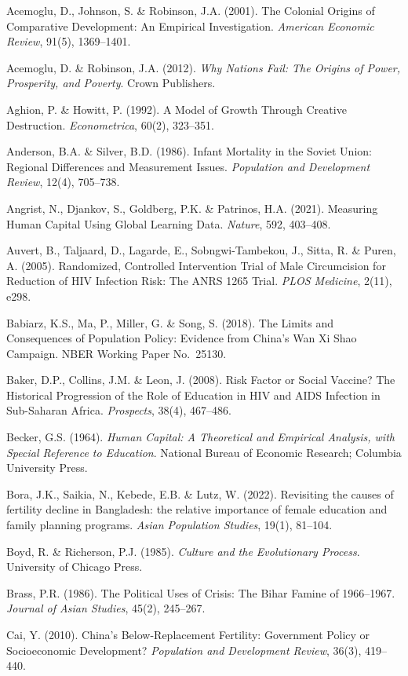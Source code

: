 Acemoglu, D., Johnson, S. \& Robinson, J.A. (2001). The Colonial Origins of Comparative Development: An Empirical Investigation. \emph{American Economic Review}, 91(5), 1369--1401.

Acemoglu, D. \& Robinson, J.A. (2012). \emph{Why Nations Fail: The
Origins of Power, Prosperity, and Poverty}. Crown Publishers.

Aghion, P. \& Howitt, P. (1992). A Model of Growth Through Creative
Destruction. \emph{Econometrica}, 60(2), 323--351.

Anderson, B.A. \& Silver, B.D. (1986). Infant Mortality in the Soviet
Union: Regional Differences and Measurement Issues. \emph{Population
and Development Review}, 12(4), 705--738.

Angrist, N., Djankov, S., Goldberg, P.K. \& Patrinos, H.A. (2021).
Measuring Human Capital Using Global Learning Data. \emph{Nature}, 592,
403--408.

Auvert, B., Taljaard, D., Lagarde, E., Sobngwi-Tambekou, J., Sitta, R.
\& Puren, A. (2005). Randomized, Controlled Intervention Trial of Male
Circumcision for Reduction of HIV Infection Risk: The ANRS 1265 Trial.
\emph{PLOS Medicine}, 2(11), e298.

Babiarz, K.S., Ma, P., Miller, G. \& Song, S. (2018). The Limits and
Consequences of Population Policy: Evidence from China's Wan Xi Shao
Campaign. NBER Working Paper No.~25130.

Baker, D.P., Collins, J.M. \& Leon, J. (2008). Risk Factor or Social
Vaccine? The Historical Progression of the Role of Education in HIV and
AIDS Infection in Sub-Saharan Africa. \emph{Prospects}, 38(4), 467--486.

Becker, G.S. (1964). \emph{Human Capital: A Theoretical and Empirical
Analysis, with Special Reference to Education}. National Bureau of
Economic Research; Columbia University Press.

Bora, J.K., Saikia, N., Kebede, E.B. \& Lutz, W. (2022). Revisiting
the causes of fertility decline in Bangladesh: the relative importance
of female education and family planning programs. \emph{Asian Population
Studies}, 19(1), 81--104.

Boyd, R. \& Richerson, P.J. (1985). \emph{Culture and the Evolutionary
Process}. University of Chicago Press.

Brass, P.R. (1986). The Political Uses of Crisis: The Bihar Famine of
1966--1967. \emph{Journal of Asian Studies}, 45(2), 245--267.

Cai, Y. (2010). China's Below-Replacement Fertility: Government Policy
or Socioeconomic Development? \emph{Population and Development Review},
36(3), 419--440.

